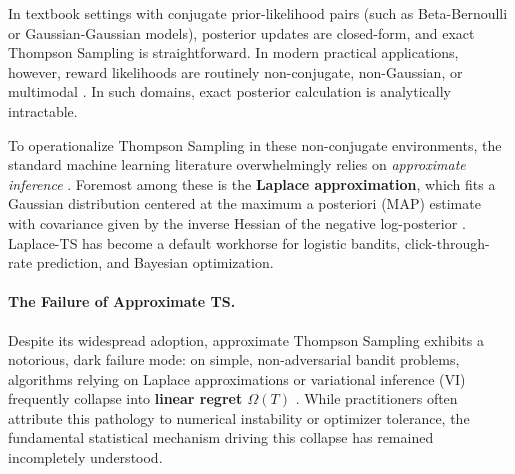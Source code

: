 \documentclass[twoside]{article}
\begin{document}
In textbook settings with conjugate prior-likelihood pairs (such as Beta-Bernoulli or Gaussian-Gaussian models), posterior updates are closed-form, and exact Thompson Sampling is straightforward. In modern practical applications, however, reward likelihoods are routinely non-conjugate, non-Gaussian, or multimodal \citep{chapelle2011empirical, riquelme2018deep}. In such domains, exact posterior calculation is analytically intractable. 

To operationalize Thompson Sampling in these non-conjugate environments, the standard machine learning literature overwhelmingly relies on \emph{approximate inference} \citep{chapelle2011empirical, phan2019thompson, mazumdar2020approximate}. Foremost among these is the \textbf{Laplace approximation}, which fits a Gaussian distribution centered at the maximum a posteriori (MAP) estimate with covariance given by the inverse Hessian of the negative log-posterior \citep{mackay2003information, bishop2006pattern}. Laplace-TS has become a default workhorse for logistic bandits, click-through-rate prediction, and Bayesian optimization.

\paragraph{The Failure of Approximate TS.}
Despite its widespread adoption, approximate Thompson Sampling exhibits a notorious, dark failure mode: on simple, non-adversarial bandit problems, algorithms relying on Laplace approximations or variational inference (VI) frequently collapse into \textbf{linear regret $\Omega(T)$} \citep{lu2017ensemble, dwarakanath2020limitations}. While practitioners often attribute this pathology to numerical instability or optimizer tolerance, the fundamental statistical mechanism driving this collapse has remained incompletely understood.
\end{document}
